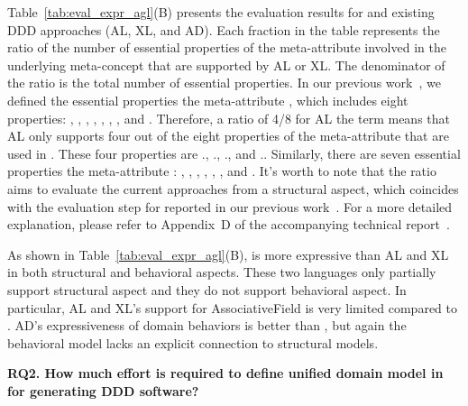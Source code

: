 Table~\ref{tab:eval_expr_agl}(B) presents the evaluation results for \agldcsl and existing DDD approaches (AL, XL, and AD). Each fraction in the table represents the ratio of the number of essential properties of the meta-attribute involved in the underlying meta-concept that are supported by AL or XL. The denominator of the ratio is the total number of essential properties. In our previous work~\cite{le_domain_2018}, we defined the essential properties \wrt the meta-attribute , which includes eight properties: , , , , , , , and . Therefore, a ratio of 4/8 for AL \wrt the term  means that AL only supports four out of the eight properties of the meta-attribute  that are used in . These four properties are ., 
., 
., and 
.. Similarly, there are seven essential properties \wrt the meta-attribute : , , , , , , and . It's worth to note that the ratio aims to evaluate the current approaches from a structural aspect, which coincides with the evaluation step for \dcsl reported in our previous work~\cite{le_domain_2018}. For a more detailed explanation, please refer to Appendix~D of the accompanying technical report~\cite{dang2023aglTechReport}.

As shown in Table~\ref{tab:eval_expr_agl}(B), \agldcsl is more expressive than AL and XL in both structural and behavioral aspects. These two languages only partially support structural aspect and they do not support behavioral aspect. In particular, AL and XL's support for AssociativeField is very limited compared to \agldcsl. AD's expressiveness of domain behaviors is better than \agl, but again the behavioral model lacks an explicit connection to structural models.


\noindent \textbf{RQ2. How much effort is required to define unified domain model in \agldcsl for generating DDD software?}

